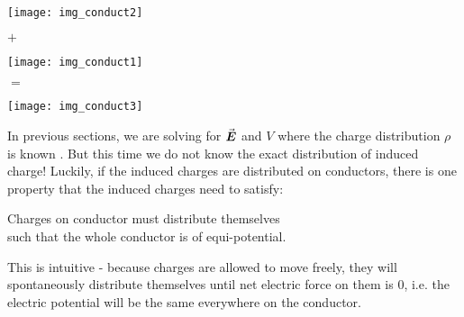 \documentclass[class=article, crop=false, 12pt]{standalone}
\begin{document}
\begin{center}
    \begin{minipage}{0.16\linewidth}
        \centering
        \texttt{[image: img\_conduct2]}
    \end{minipage}
    {\Large \quad$+$\quad}
    \begin{minipage}{0.18\linewidth}
        \centering
        \texttt{[image: img\_conduct1]}
    \end{minipage}
    {\Large \quad$=$\quad}
    \begin{minipage}{0.22\linewidth}
        \centering
        \texttt{[image: img\_conduct3]}
    \end{minipage}
\end{center}

In previous sections, 
we are solving for $\va*{E}$ and $V$ where the charge distribution $\rho$ is known .
But this time we do not know the exact distribution of induced charge!
Luckily, if the induced charges are distributed on conductors,
there is one property that the induced charges need to satisfy:

\begin{center}
    \begin{minipage}{0.6\textwidth}
        \begin{framed}
            \centering
            Charges on conductor must distribute themselves\\ such that the whole conductor is of equi-potential.
        \end{framed}       
    \end{minipage}
\end{center}

This is intuitive - because charges are allowed to move freely,
they will spontaneously distribute themselves until net electric force on them is $0$,
i.e. the electric potential will be the same everywhere on the conductor.
\end{document}
